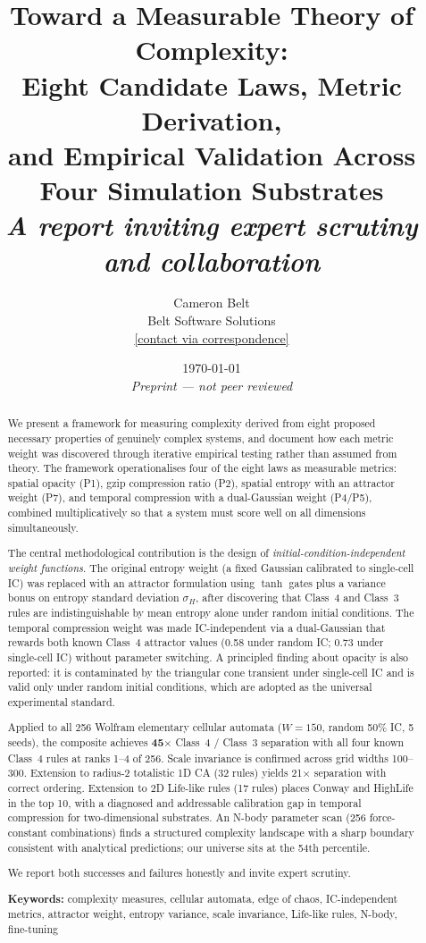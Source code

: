 \documentclass[12pt,a4paper]{article}
\title{\textbf{Toward a Measurable Theory of Complexity:\\
Eight Candidate Laws, Metric Derivation,\\
and Empirical Validation Across Four Simulation Substrates}\\[0.8em]
\large\textit{A report inviting expert scrutiny and collaboration}}
\author{Cameron Belt\\
\small Belt Software Solutions\\
\small \href{mailto:}{[contact via correspondence]}}
\date{\today\\[0.3em]
\small\textit{Preprint --- not peer reviewed}}
\begin{document}
\maketitle

\begin{abstract}
\noindent
We present a framework for measuring complexity derived from eight proposed
necessary properties of genuinely complex systems, and document how each
metric weight was discovered through iterative empirical testing rather than
assumed from theory.
The framework operationalises four of the eight laws as measurable metrics:
spatial opacity (P1), gzip compression ratio (P2), spatial entropy with an
attractor weight (P7), and temporal compression with a dual-Gaussian weight
(P4/P5), combined multiplicatively so that a system must score well on all
dimensions simultaneously.

The central methodological contribution is the design of
\emph{initial-condition-independent weight functions}.
The original entropy weight (a fixed Gaussian calibrated to single-cell IC)
was replaced with an attractor formulation using $\tanh$ gates plus a
variance bonus on entropy standard deviation $\sigma_H$, after discovering
that Class~4 and Class~3 rules are indistinguishable by mean entropy alone
under random initial conditions.
The temporal compression weight was made IC-independent via a dual-Gaussian
that rewards both known Class~4 attractor values (0.58 under random IC;
0.73 under single-cell IC) without parameter switching.
A principled finding about opacity is also reported: it is contaminated by
the triangular cone transient under single-cell IC and is valid only under
random initial conditions, which are adopted as the universal experimental
standard.

Applied to all 256 Wolfram elementary cellular automata ($W{=}150$,
random 50\% IC, 5 seeds), the composite achieves \textbf{45$\times$}
Class~4 / Class~3 separation with all four known Class~4 rules at ranks 1--4
of 256.
Scale invariance is confirmed across grid widths 100--300.
Extension to radius-2 totalistic 1D CA (32 rules) yields 21$\times$
separation with correct ordering.
Extension to 2D Life-like rules (17 rules) places Conway and HighLife in
the top 10, with a diagnosed and addressable calibration gap in temporal
compression for two-dimensional substrates.
An N-body parameter scan (256 force-constant combinations) finds a structured
complexity landscape with a sharp boundary consistent with analytical
predictions; our universe sits at the 54th percentile.

We report both successes and failures honestly and invite expert scrutiny.

\bigskip
\noindent\textbf{Keywords:} complexity measures, cellular automata,
edge of chaos, IC-independent metrics, attractor weight, entropy variance,
scale invariance, Life-like rules, N-body, fine-tuning
\end{abstract}
\end{document}
